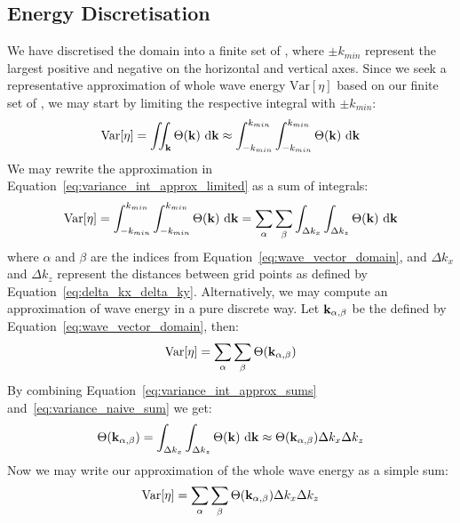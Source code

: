 \subsection{Energy Discretisation}
%
We have discretised the \wavevector domain into a finite set of \wavevectors, 
where $\pm k_{min}$ represent the largest positive and negative \wavenumbers on 
the horizontal and vertical axes. Since we seek a representative approximation 
of whole wave energy $\mathrm{Var}[\eta]$ based on our finite set of \wavevectors, we may 
start by limiting the respective integral with $\pm k_{min}$:
\begin{equation}
\label{eq:variance_int_approx_limited}
\mathrm{Var}[\eta] = \iint_{\mathbf{k}}\Theta(\mathbf{k})~\mathrm{d}\mathbf{k}
\approx\int_{-k_{min}}^{k_{min}}\int_{-k_{min}}^{k_{min}}\Theta(\mathbf{k}
)~\mathrm{d}\mathbf{k}
\end{equation}
We may rewrite the approximation in 
Equation~\ref{eq:variance_int_approx_limited} as a sum of integrals:
%
\begin{equation}
\label{eq:variance_int_approx_sums}
 \mathrm{Var}[\eta] = \int_{-k_{min}}^{k_{min}}\int_{-k_{min}}^{k_{min}}\Theta(\mathbf{k}
)~\mathrm{d}\mathbf{k} = \sum_{\alpha}\sum_{\beta}\int_{\Delta k_x}\int_{\Delta 
k_z}\Theta(\mathbf{k})~\mathrm{d}\mathbf{k}
\end{equation}
%
where $\alpha$ and $\beta$ are the indices from 
Equation~\ref{eq:wave_vector_domain}, and $\Delta k_x$ and $\Delta k_z$ 
represent the distances between grid points as defined by 
Equation~\ref{eq:delta_kx_delta_ky}. Alternatively, we may compute an 
approximation of wave energy in a pure discrete way. Let 
$\mathbf{k}_{\alpha,\beta}$ be the \wavevectors defined by 
Equation~\ref{eq:wave_vector_domain}, then:
%
\begin{equation}
\label{eq:variance_naive_sum}
 \mathrm{Var}[\eta] = \sum_{\alpha}\sum_{\beta}\Theta(\mathbf{k}_{\alpha,\beta})
\end{equation}
%
By combining Equation~\ref{eq:variance_int_approx_sums} 
and~\ref{eq:variance_naive_sum} we get:
%
\begin{equation}
 \Theta(\mathbf{k}_{\alpha,\beta}) = \int_{\Delta k_x}\int_{\Delta 
k_z}\Theta(\mathbf{k})~\mathrm{d}\mathbf{k} \approx 
\Theta(\mathbf{k}_{\alpha,\beta})\Delta k_x\Delta k_z
\end{equation}
Now we may write our approximation of the whole wave energy as a simple sum:
\begin{equation}
\label{eq:variance_discrete}
 \mathrm{Var}[\eta] = \sum_{\alpha}\sum_{\beta}\Theta(\mathbf{k}_{\alpha,\beta})\Delta k_x 
\Delta k_z
\end{equation}
%
